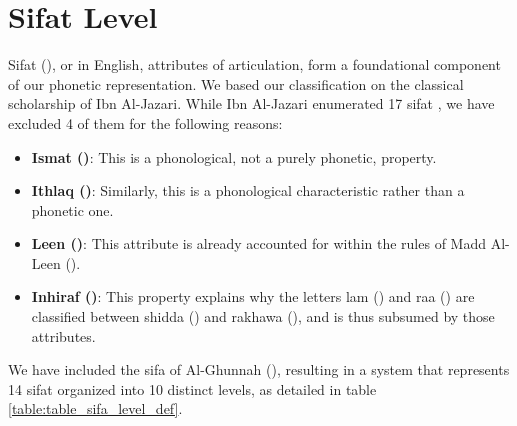 










\section{Sifat Level}

Sifat (), or in English, attributes of articulation, form a foundational component of our phonetic representation. We based our classification on the classical scholarship of Ibn Al-Jazari. While Ibn Al-Jazari enumerated 17 sifat \cite{AlJazariyyahSwaid}, we have excluded 4 of them for the following reasons:

\begin{itemize}
\item \textbf{Ismat ()}: This is a phonological, not a purely phonetic, property.
\item \textbf{Ithlaq ()}: Similarly, this is a phonological characteristic rather than a phonetic one.
\item \textbf{Leen ()}: This attribute is already accounted for within the rules of Madd Al-Leen ().
\item \textbf{Inhiraf ()}: This property explains why the letters lam () and raa () are classified between shidda () and rakhawa (), and is thus subsumed by those attributes.
\end{itemize}

We have included the sifa of Al-Ghunnah (), resulting in a system that represents 14 sifat organized into 10 distinct levels, as detailed in table \ref{table:table_sifa_level_def}.

